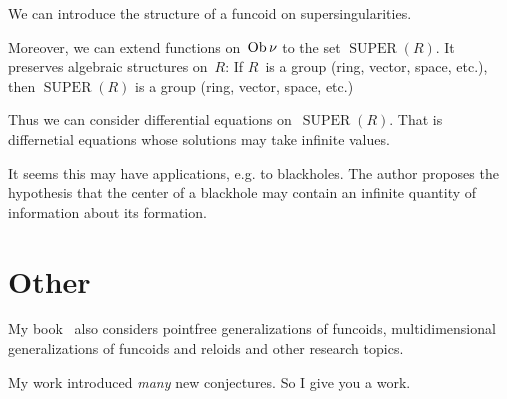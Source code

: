 \documentclass{amsart}
\begin{document}
We can introduce the structure of a funcoid on supersingularities.

Moreover, we can extend functions on~$\operatorname{Ob}\nu$ to the set
$\operatorname{SUPER}(R)$. It preserves algebraic structures
on~$R$: If $R$~is a group (ring, vector, space, etc.), then $\operatorname{SUPER}(R)$ is a group (ring, vector, space, etc.)

Thus we can consider differential equations
on~$\operatorname{SUPER}(R)$. That is differnetial equations
whose solutions may take infinite values.

It seems this may have applications, e.g. to blackholes.
The author proposes the hypothesis that the center of a blackhole
may contain an infinite quantity of information about its
formation.

\section{Other}

My book~\cite{volume-1-edition1} also considers pointfree generalizations of funcoids,
multidimensional generalizations of funcoids and reloids and other research topics.

My work introduced \emph{many} new conjectures. So I give you a work.



\end{document}
